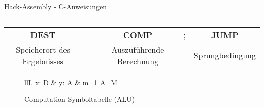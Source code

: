 \documentclass[12pt]{report}
\newcommand*\sepline{%
   \begin{center}
     \rule[1ex]{\textwidth}{.5pt}
   \end{center}}
\begin{document}
\begin{samepage}
    \begin{center}
        \Huge
        Hack-Assembly - C-Anweisungen
    \end{center}
    \sepline

    \centering
    \begin{tabular}{ccccc}
        \textbf{DEST}               & = & \textbf{COMP}            & ; & \textbf{JUMP}   \\
        Speicherort des Ergebnisses &   & Auszuführende Berechnung &   & Sprungbedingung
    \end{tabular}
    \begin{figure}[H]
        \begin{minipage}[t]{0.45\textwidth}
            \centering
            \begin{table}[H]
                \caption*{Computation Symboltabelle (ALU)}
                \centering
                \begin{tabular}{llL}
                    x: D & y: A & m=1 \rightarrow A=M \\
                \end{tabular}


\end{table}
\end{minipage}
\end{figure}
\end{samepage}
\end{document}
